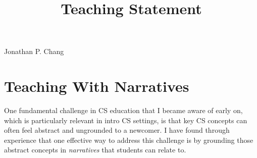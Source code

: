 \documentclass[12pt,letterpaper]{article}
\title{Teaching Statement}
\newcommand\intropar\lateachingintro
\newcommand\intropar\genteachingintro
\begin{document}
\maketitle

{\centering Jonathan P. Chang \par}

\vspace{0.5\baselineskip}
\intropar
%


\section{Teaching With Narratives}
One fundamental challenge in CS education that I became aware of early on, which is particularly relevant in intro CS settings, is that key CS concepts can often feel abstract and ungrounded to a newcomer.
I have found through experience that one effective way to address this challenge is by grounding those abstract concepts in \emph{narratives} that students can relate to.
\end{document}

